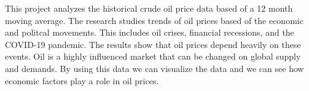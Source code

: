 This project analyzes the historical crude oil price data based of a 12 month moving average. The research studies trends of oil prices based of the economic and politcal movements. This includes oil crises, financial recessions, and the COVID-19 pandemic. The results show that oil prices depend heavily on these events. Oil is a highly influenced market that can be changed on global supply and demands. By using this data we can visualize the data and we can see how economic factors play a role in oil prices.
